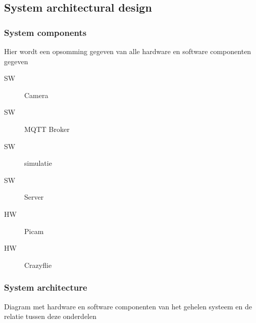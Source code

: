 \subsection{System architectural design}

\subsubsection{System components}
Hier wordt een opsomming gegeven van alle hardware en software componenten gegeven

\begin{description}
    \item[SW] Camera
    \item[SW] MQTT Broker
    \item[SW] simulatie
    \item[SW] Server
    \item[HW] Picam
    \item[HW] Crazyflie   
\end{description}

\subsubsection{System architecture}
Diagram met hardware en software componenten van het gehelen systeem en de relatie tussen deze onderdelen
